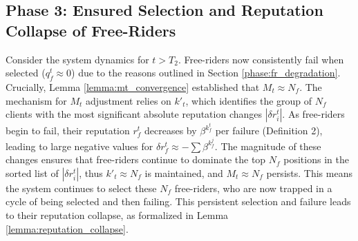 \documentclass[conference]{IEEEtran}
\begin{document}
\subsection{Phase 3: Ensured Selection and Reputation Collapse of Free-Riders}
\label{phase:fr_collapse_main}
Consider the system dynamics for $t > T_2$. Free-riders now consistently fail when selected ($q_f^t \approx 0$) due to the reasons outlined in Section \ref{phase:fr_degradation}.
Crucially, Lemma \ref{lemma:mt_convergence} established that $M_t \approx N_f$. The mechanism for $M_t$ adjustment relies on $k'_t$, which identifies the group of $N_f$ clients with the most significant absolute reputation changes $|\delta r_i^t|$. As free-riders begin to fail, their reputation $r_f^t$ decreases by $\beta^{k_f^t}$ per failure (Definition 2), leading to large negative values for $\delta r_f^t \approx -\sum \beta^{k_f^j}$. The magnitude of these changes ensures that free-riders continue to dominate the top $N_f$ positions in the sorted list of $|\delta r_i^t|$, thus $k'_t \approx N_f$ is maintained, and $M_t \approx N_f$ persists.
This means the system continues to select these $N_f$ free-riders, who are now trapped in a cycle of being selected and then failing. This persistent selection and failure leads to their reputation collapse, as formalized in Lemma \ref{lemma:reputation_collapse}.
\end{document}
